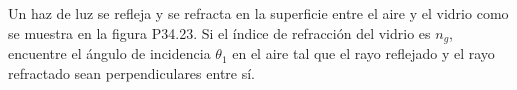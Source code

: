 \item Un haz de luz se refleja y se refracta en la superficie entre el aire y el vidrio como se muestra en la figura P34.23. Si el índice de refracción del vidrio es $n_g$, encuentre el ángulo de incidencia $\theta_1$ en el aire tal que el rayo reflejado y el rayo refractado sean perpendiculares entre sí.